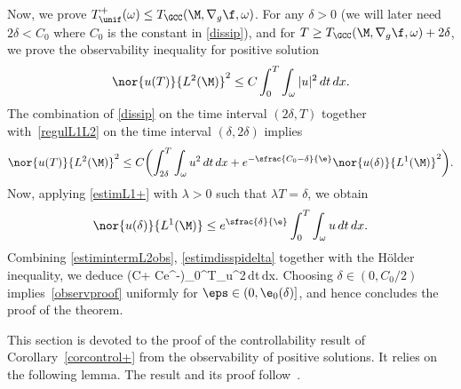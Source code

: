 Now, we prove $T_{\unif}^{+}(\omega)\leq T_{\GCC}(\M, \nabla_g\f,\omega)$.
For any $\delta>0$ (we will later need $2\delta<C_{0}$ where $C_{0}$ is the constant in \eqref{dissip}), and for $T\geq T_{\GCC}(\M, \nabla_g\f,\omega)+2\delta$, we prove the observability inequality for positive solution
\begin{equation}
\label{observproof}
\nor{u(T)}{L^{2}(\M)}^2\leq C \int_{0}^{T}\int_{\omega}|u|^{2}\,dt\,dx.
\end{equation}
The combination of \eqref{dissip} on the time interval $(2\delta,T)$ together with~\eqref{regulL1L2} on the time interval $(\delta, 2\delta)$ implies
\begin{equation}
\label{estimintermL2obs}
\nor{u(T)}{L^{2}(\M)}^2 \leq C \biggl(\int_{2\delta}^{T}\int_{\omega}u^{2}\,dt\,dx+e^{-\sfrac{C_{0}-\delta}{\e}} \nor{u(\delta)}{L^{1}(\M)}^2 \biggr).
\end{equation}
Now, applying \eqref{estimL1+} with $\lambda>0$ such that $\lambda T=\delta$, we obtain
\begin{equation}
\label{estimdisspidelta}
\nor{u(\delta)}{L^{1}(\M)} \leq e^{\sfrac{\delta}{\e}}\int_{0}^{T}\int_{\omega}u\, dt\,dx.
\end{equation}
Combining \eqref{estimintermL2obs}, \eqref{estimdisspidelta} together with the Hölder inequality, we deduce
\bal
{}\leq \bigl(C+ Ce^{-}\bigr)\int_{0}^{T}\int_{\omega}u^{2}\,dt\,dx.
\nal
Choosing $\delta\in (0,C_0/2)$ implies~\eqref{observproof} uniformly for $\eps \in (0,\e_{0}(\delta)]$, and hence concludes the proof of the theorem.
\enp

\label{s:cont-pos}
This section is devoted to the proof of the controllability result of Corollary~\ref{corcontrol+} from the observability of positive solutions.
It relies on the following lemma. The result and its proof follow~\cite[Th.\,4.1]{L:18}.

